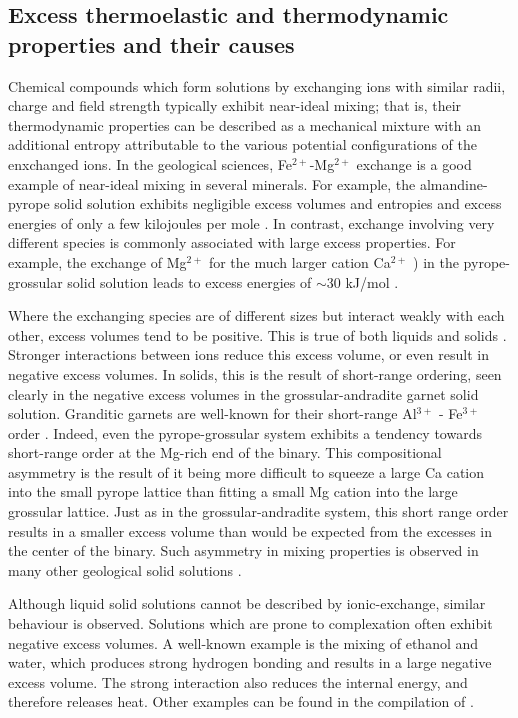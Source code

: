 \subsection{Excess thermoelastic and thermodynamic properties and their causes}
\label{sec:obs}
Chemical compounds which form solutions by exchanging ions with similar radii, charge and field strength typically exhibit near-ideal mixing; that is, their thermodynamic properties can be described as a mechanical mixture with an additional entropy attributable to the various potential configurations of the enxchanged ions. In the geological sciences, Fe$^{2+}$-Mg$^{2+}$ exchange is a good example of near-ideal mixing in several minerals. For example, the almandine-pyrope solid solution exhibits negligible excess volumes and entropies and excess energies of only a few kilojoules per mole \citep[on a three-site basis;][]{GCT1996, WPHJG2014}. In contrast, exchange involving very different species is commonly associated with large excess properties. For example, the exchange of Mg$^{2+}$ for the much larger cation Ca$^{2+}$ \citep[0.89 \AA and 1.12 \AA respectively;][]{Shannon1976}) in the pyrope-grossular solid solution leads to excess energies of $\sim$30 kJ/mol \citep{GCT1996}. 

Where the exchanging species are of different sizes but interact weakly with each other, excess volumes tend to be positive. This is true of both liquids \citep[e.g. benzene-cyclohexane;][]{FM1965} and solids \citep[e.g. pyrope-grossular;][]{GCT1996}. Stronger interactions between ions reduce this excess volume, or even result in negative excess volumes. In solids, this is the result of short-range ordering, seen clearly in the negative excess volumes in the grossular-andradite garnet solid solution. Granditic garnets are well-known for their short-range Al$^{3+}$ - Fe$^{3+}$ order \citep[e.g.][]{BP2002}. Indeed, even the pyrope-grossular system exhibits a tendency towards short-range order at the Mg-rich end of the binary. This compositional asymmetry is the result of it being more difficult to squeeze a large Ca cation into the small pyrope lattice than fitting a small Mg cation into the large grossular lattice. Just as in the grossular-andradite system, this short range order results in a smaller excess volume than would be expected from the excesses in the center of the binary. Such asymmetry in mixing properties is observed in many other geological solid solutions \citep{NW1980}.

Although liquid solid solutions cannot be described by ionic-exchange, similar behaviour is observed. Solutions which are prone to complexation often exhibit negative excess volumes. A well-known example is the mixing of ethanol and water, which produces strong hydrogen bonding and results in a large negative excess volume. The strong interaction also reduces the internal energy, and therefore releases heat. Other examples can be found in the compilation of \cite{FM1965}.


